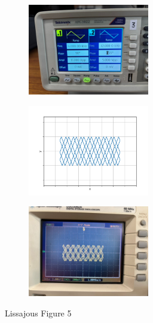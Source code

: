 \documentclass[a4paper,12pt]{article}
\begin{document}
\begin{figure}[h!]
	\begin{subfigure}[b]{10pt}
		\includegraphics[width = 150pt]{figs/fig5.jpeg}
	\end{subfigure}
	\hspace{120pt}
	\begin{subfigure}[b]{10pt}
		\includegraphics[width = 150pt]{figs/fig5.png}
	\end{subfigure}
	\hspace{130pt}
	\begin{subfigure}[b]{10pt}
		\includegraphics[width = 150pt]{figs/fig5_1.jpeg}
	\end{subfigure}
	\caption{Lissajous Figure 5}
\end{figure}
\end{document}
